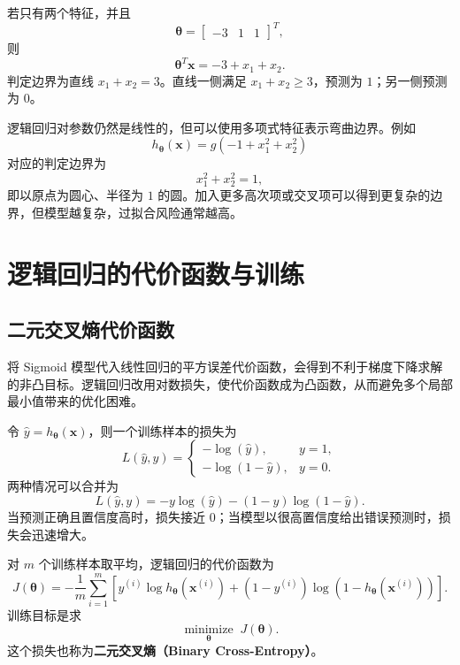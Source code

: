 \documentclass[12pt,a4paper]{ctexart}
\newcommand{\concept}[1]{\textbf{\textcolor{DefineColor}{#1}}}
\begin{document}
\begin{examplebox}[线性判定边界]
若只有两个特征，并且
\[
  \boldsymbol{\theta}=
  \begin{bmatrix}-3&1&1\end{bmatrix}^{T},
\]
则
\[
  \boldsymbol{\theta}^{T}\mathbf{x}=-3+x_1+x_2.
\]
判定边界为直线 $x_1+x_2=3$。直线一侧满足 $x_1+x_2\geq3$，预测为 $1$；另一侧预测为 $0$。
\end{examplebox}

\begin{examplebox}[非线性判定边界]
逻辑回归对参数仍然是线性的，但可以使用多项式特征表示弯曲边界。例如
\[
  h_{\boldsymbol{\theta}}(\mathbf{x})
  =g\!\left(-1+x_1^2+x_2^2\right)
\]
对应的判定边界为
\[
  x_1^2+x_2^2=1,
\]
即以原点为圆心、半径为 $1$ 的圆。加入更多高次项或交叉项可以得到更复杂的边界，但模型越复杂，过拟合风险通常越高。
\end{examplebox}

\section{逻辑回归的代价函数与训练}

\subsection{二元交叉熵代价函数}

\begin{mistakebox}[不能直接照搬平方误差]
将 Sigmoid 模型代入线性回归的平方误差代价函数，会得到不利于梯度下降求解的非凸目标。逻辑回归改用对数损失，使代价函数成为凸函数，从而避免多个局部最小值带来的优化困难。
\end{mistakebox}

\begin{definitionbox}[单个样本的对数损失]
令 $\hat y=h_{\boldsymbol{\theta}}(\mathbf{x})$，则一个训练样本的损失为
\[
  L(\hat y,y)=
  \begin{cases}
    -\log(\hat y), & y=1,\\
    -\log(1-\hat y), & y=0.
  \end{cases}
\]
两种情况可以合并为
\[
  L(\hat y,y)
  =-y\log(\hat y)-(1-y)\log(1-\hat y).
\]
当预测正确且置信度高时，损失接近 $0$；当模型以很高置信度给出错误预测时，损失会迅速增大。
\end{definitionbox}

\begin{keybox}[训练集上的代价函数]
对 $m$ 个训练样本取平均，逻辑回归的代价函数为
\[
  J(\boldsymbol{\theta})
  =-\frac{1}{m}\sum_{i=1}^{m}
  \left[
    y^{(i)}\log h_{\boldsymbol{\theta}}\!\left(\mathbf{x}^{(i)}\right)
    +(1-y^{(i)})\log\!\left(1-h_{\boldsymbol{\theta}}\!\left(\mathbf{x}^{(i)}\right)\right)
  \right].
\]
训练目标是求
\[
  \underset{\boldsymbol{\theta}}{\operatorname{minimize}}
  \;J(\boldsymbol{\theta}).
\]
这个损失也称为\concept{二元交叉熵（Binary Cross-Entropy）}。
\end{keybox}
\end{document}
